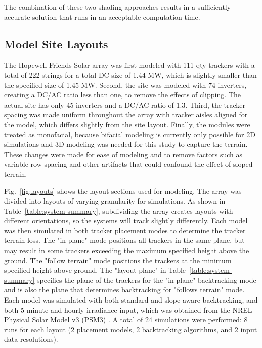 \documentclass[conference]{IEEEtran}
\begin{document}
The combination of these two shading approaches results in a sufficiently accurate solution that runs in an acceptable computation time.

\subsection{Model Site Layouts}

The Hopewell Friends Solar array was first modeled with 111-qty trackers with a total of 222 strings for a total DC size of 1.44-MW, which is slightly smaller than the specified size of 1.45-MW. Second, the site was modeled with 74 inverters, creating a DC/AC ratio less than one, to remove the effects of clipping. The actual site has only 45 inverters and a DC/AC ratio of 1.3. Third, the tracker spacing was made uniform throughout the array with tracker aisles aligned for the model, which differs slightly from the site layout. Finally, the modules were treated as monofacial, because bifacial modeling is currently only possible for 2D simulations and 3D modeling was needed for this study to capture the terrain. These changes were made for ease of modeling and to remove factors such as variable row spacing and other artifacts that could confound the effect of sloped terrain.

Fig.~\ref{fig:layouts} shows the layout sections used for modeling. The array was divided into layouts of varying granularity for simulations. As shown in Table~\ref{table:system-summary}, subdividing the array creates layouts with different orientations, so the systems will track slightly differently. Each model was then simulated in both tracker placement modes to determine the tracker terrain loss. The "in-plane" mode positions all trackers in the same plane, but may result in some trackers exceeding the maximum specified height above the ground. The "follow terrain" mode positions the trackers at the minimum specified height above ground. The "layout-plane" in Table~\ref{table:system-summary} specifies the plane of the trackers for the "in-plane" backtracking mode and is also the plane that determines backtracking for "follows terrain" mode. Each model was simulated with both standard \cite{Marion2013} and slope-aware \cite{Anderson2020} backtracking, and both 5-minute and hourly irradiance input, which was obtained from the NREL Physical Solar Model v3 (PSM3) \cite{Sengupta2018}. A total of 24 simulations were performed: 8 runs for each layout (2 placement models, 2 backtracking algorithms, and 2 input data resolutions).
\end{document}
